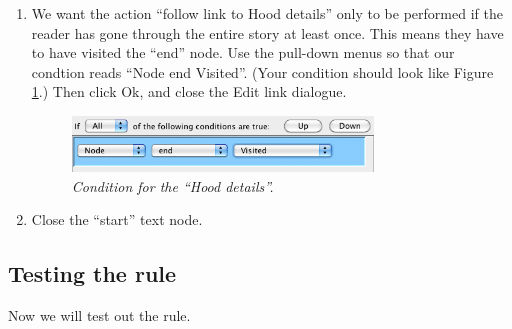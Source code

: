\documentclass{article}
\begin{document}
\begin{enumerate}
\item We want the action ``follow link to Hood details'' only to be performed if
the reader has gone through the entire story at least once. This means they have
to have visited the ``end'' node. Use the pull-down menus so that our condtion
reads ``Node end Visited''. (Your condition should look like Figure
\ref{fig:tut1:condition_hood_details}.) Then click Ok, and close the Edit link
dialogue.

\begin{figure}[ht]
  \centering
  \includegraphics[width=8cm]{images/hypedyn-tutorial-1-figure-14}
  \caption{\textit{Condition for the ``Hood details''.}}
  \label{fig:tut1:condition_hood_details}
\end{figure} 

\item Close the ``start'' text node.
\end{enumerate}

\subsection{Testing the rule}

Now we will test out the rule.
\end{document}
